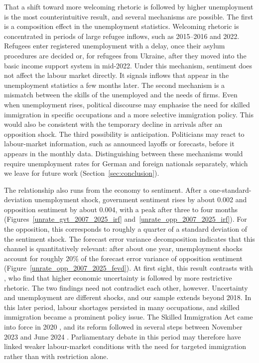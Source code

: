 \documentclass[12pt]{scrartcl}
\numberwithin{equation}{section}				%
\begin{document}
    That a shift toward more welcoming rhetoric is followed by higher unemployment is the most counterintuitive result, and several mechanisms are possible. The first is a composition effect in the unemployment statistics. Welcoming rhetoric is concentrated in periods of large refugee inflows, such as 2015--2016 and 2022. Refugees enter registered unemployment with a delay, once their asylum procedures are decided or, for refugees from Ukraine, after they moved into the basic income support system in mid-2022. Under this mechanism, sentiment does not affect the labour market directly. It signals inflows that appear in the unemployment statistics a few months later. The second mechanism is a mismatch between the skills of the unemployed and the needs of firms. Even when unemployment rises, political discourse may emphasise the need for skilled immigration in specific occupations and a more selective immigration policy. This would also be consistent with the temporary decline in arrivals after an opposition shock. The third possibility is anticipation. Politicians may react to labour-market information, such as announced layoffs or forecasts, before it appears in the monthly data. Distinguishing between these mechanisms would require unemployment rates for German and foreign nationals separately, which we leave for future work (Section~\ref{sec:conclusion}).
   
    The relationship also runs from the economy to sentiment. After a one-standard-deviation unemployment shock, government sentiment rises by about 0.002 and opposition sentiment by about 0.004, with a peak after three to four months (Figures~\ref{unrate_gvt_2007_2025_irf} and~\ref{unrate_opp_2007_2025_irf}). For the opposition, this corresponds to roughly a quarter of a standard deviation of the sentiment shock. The forecast error variance decomposition indicates that this channel is quantitatively relevant: after about one year, unemployment shocks account for roughly 20\% of the forecast error variance of opposition sentiment (Figure~\ref{unrate_opp_2007_2025_fevd}). At first sight, this result contrasts with \textcite{abdelatif2026uncertainty}, who find that higher economic uncertainty is followed by more restrictive rhetoric. The two findings need not contradict each other, however. Uncertainty and unemployment are different shocks, and our sample extends beyond 2018. In this later period, labour shortages persisted in many occupations, and skilled immigration became a prominent policy issue. The Skilled Immigration Act came into force in 2020 \parencite{feg2019}, and its reform followed in several steps between November 2023 and June 2024 \parencite{feg2023}. Parliamentary debate in this period may therefore have linked weaker labour-market conditions with the need for targeted immigration rather than with restriction alone.
    
\end{document}
